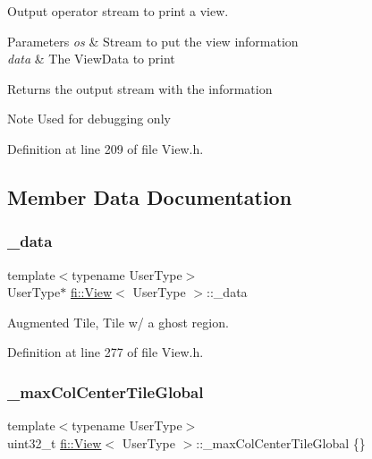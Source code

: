 Output operator stream to print a view. 


\begin{DoxyParams}{Parameters}
{\em os} & Stream to put the view information \\
\hline
{\em data} & The View\+Data to print \\
\hline
\end{DoxyParams}
\begin{DoxyReturn}{Returns}
the output stream with the information 
\end{DoxyReturn}
\begin{DoxyNote}{Note}
Used for debugging only 
\end{DoxyNote}


Definition at line 209 of file View.\+h.



\subsection{Member Data Documentation}
\mbox{\label{classfi_1_1View_a96a3a09cea8cdc605c758d6bc63e989a}} 
\subsubsection{\texorpdfstring{\+\_\+data}{\_data}}
{\footnotesize\ttfamily template$<$typename User\+Type$>$ \\
User\+Type$\ast$ \hyperlink{classfi_1_1View}{fi\+::\+View}$<$ User\+Type $>$\+::\+\_\+data\hspace{0.3cm}{\ttfamily [private]}}



Augmented Tile, Tile w/ a ghost region. 



Definition at line 277 of file View.\+h.

\mbox{\label{classfi_1_1View_a97df6aed1697d0a729fe0fc051fd8bcc}} 
\subsubsection{\texorpdfstring{\+\_\+max\+Col\+Center\+Tile\+Global}{\_maxColCenterTileGlobal}}
{\footnotesize\ttfamily template$<$typename User\+Type$>$ \\
uint32\+\_\+t \hyperlink{classfi_1_1View}{fi\+::\+View}$<$ User\+Type $>$\+::\+\_\+max\+Col\+Center\+Tile\+Global \{\}\hspace{0.3cm}{\ttfamily [private]}}



